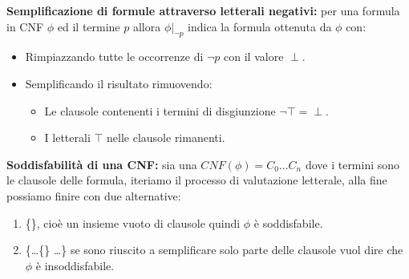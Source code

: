 \documentclass[../main.tex]{subfiles}
\begin{document}
    \textbf{Semplificazione di formule attraverso letterali negativi:} per una formula in CNF $\phi$ ed il termine $p$ allora $\phi |_{\lnot p}$ indica la formula ottenuta da $\phi$ con:
    \begin{itemize}
        \item Rimpiazzando tutte le occorrenze di $\lnot p$ con il valore $\perp$.
        \item Semplificando il risultato rimuovendo:
        \begin{itemize}
            \item Le clausole contenenti i termini di disgiunzione $\lnot \top = \perp$.
            \item I letterali $\top$ nelle clausole rimanenti.
        \end{itemize}
    \end{itemize}
    \textbf{Soddisfabilità di una CNF:} sia una $CNF(\phi)=C_0 \dots C_n$ dove i termini sono le clausole delle formula, iteriamo il processo di valutazione letterale, alla fine possiamo finire con due alternative:
    \begin{enumerate}
        \item \{\}, cioè un insieme vuoto di clausole quindi $\phi$ è soddisfabile.
        \item \{\dots \{\} \dots \} se sono riuscito a semplificare solo parte delle clausole vuol dire che $\phi$ è insoddisfabile.
    \end{enumerate}
\end{document}
